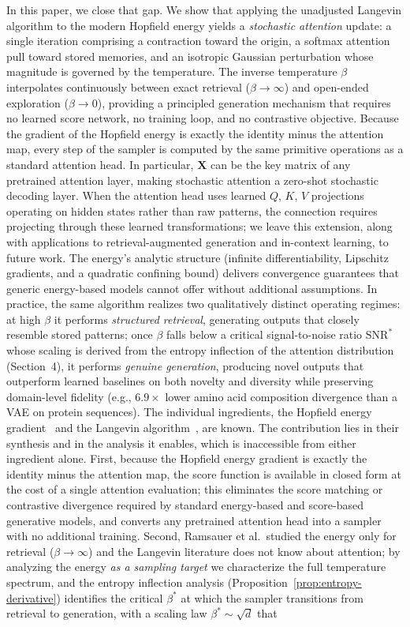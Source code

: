 In this paper, we close that gap. We show that applying the unadjusted Langevin algorithm to the modern Hopfield energy yields a \emph{stochastic attention} update: a single iteration comprising a contraction toward the origin, a softmax attention pull toward stored memories, and an isotropic Gaussian perturbation whose magnitude is governed by the temperature. The inverse temperature $\beta$ interpolates continuously between exact retrieval ($\beta\to\infty$) and open-ended exploration ($\beta\to 0$), providing a principled generation mechanism that requires no learned score network, no training loop, and no contrastive objective. Because the gradient of the Hopfield energy is exactly the identity minus the attention map, every step of the sampler is computed by the same primitive operations as a standard attention head. In particular, $\mathbf{X}$ can be the key matrix of any pretrained attention layer, making stochastic attention a zero-shot stochastic decoding layer. When the attention head uses learned $Q$, $K$, $V$ projections operating on hidden states rather than raw patterns, the connection requires projecting through these learned transformations; we leave this extension, along with applications to retrieval-augmented generation and in-context learning, to future work. The energy's analytic structure (infinite differentiability, Lipschitz gradients, and a quadratic confining bound) delivers convergence guarantees that generic energy-based models cannot offer without additional assumptions. In practice, the same algorithm realizes two qualitatively distinct operating regimes: at high $\beta$ it performs \emph{structured retrieval}, generating outputs that closely resemble stored patterns; once $\beta$ falls below a critical signal-to-noise ratio $\mathrm{SNR}^*$ whose scaling is derived from the entropy inflection of the attention distribution (Section~4), it performs \emph{genuine generation}, producing novel outputs that outperform learned baselines on both novelty and diversity while preserving domain-level fidelity (e.g., $6.9{\times}$ lower amino acid composition divergence than a VAE on protein sequences). The individual ingredients, the Hopfield energy gradient~\cite{ramsauerHopfieldNetworksAll2021} and the Langevin algorithm~\cite{robertsTweedieExponentialConvergence1996}, are known. The contribution lies in their synthesis and in the analysis it enables, which is inaccessible from either ingredient alone. First, because the Hopfield energy gradient is exactly the identity minus the attention map, the score function is available in closed form at the cost of a single attention evaluation; this eliminates the score matching or contrastive divergence required by standard energy-based and score-based generative models, and converts any pretrained attention head into a sampler with no additional training. Second, Ramsauer et al.\ studied the energy only for retrieval ($\beta\to\infty$) and the Langevin literature does not know about attention; by analyzing the energy \emph{as a sampling target} we characterize the full temperature spectrum, and the entropy inflection analysis (Proposition~\ref{prop:entropy-derivative}) identifies the critical $\beta^*$ at which the sampler transitions from retrieval to generation, with a scaling law $\beta^*\sim\sqrt{d}$ that 